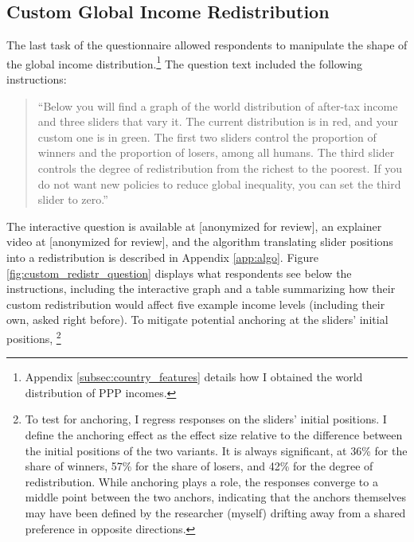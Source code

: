 \documentclass[12pt,english]{article}
\begin{document}

\subsection{Custom Global Income Redistribution}\label{subsec:custom_redistr}

The last task of the questionnaire allowed respondents to manipulate the shape of the global income distribution.\footnote{Appendix \ref{subsec:country_features} details how I obtained the world distribution of PPP incomes. } The question text included the following instructions: 
\begin{quote}``Below you will find a graph of the world distribution of after-tax income and three sliders that vary it. The current distribution is in red, and your custom one is in green. The first two sliders control the proportion of winners and the proportion of losers, among all humans. The third slider controls the degree of redistribution from the richest to the poorest. 
If you do not want new policies to reduce global inequality, you can set the third slider to zero.''\end{quote} 
The interactive question is available at [anonymized for review], %
an explainer video at [anonymized for review], %
and the algorithm translating slider positions into a redistribution is described in Appendix \ref{app:algo}. 
Figure \ref{fig:custom_redistr_question} displays what respondents see below the instructions, including the interactive graph and a table summarizing how their custom redistribution would affect five example income levels (including their own, asked right before). To mitigate potential anchoring at the sliders' initial positions,%
\footnote{To test for anchoring, I regress responses on the sliders' initial positions. %
I define the anchoring effect as the effect size relative to the difference between the initial positions of the two variants. It is always significant, at 36\% for the share of winners, 57\% for the share of losers, and 42\% for the degree of redistribution. While anchoring plays a role, the responses converge to a middle point between the two anchors, indicating that the anchors themselves may have been defined by the researcher (myself) drifting away from a shared preference in opposite directions. %
} 
\end{document}
